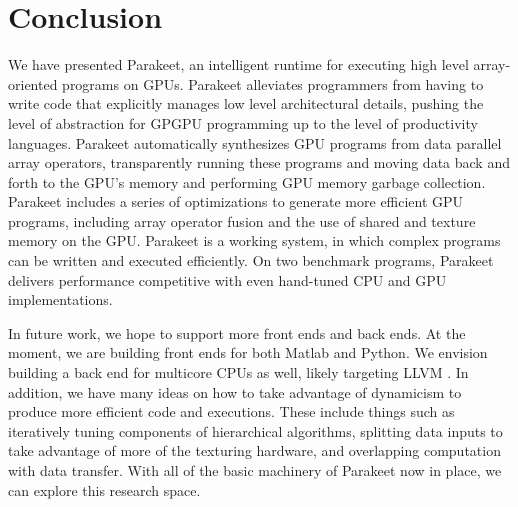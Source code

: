\documentclass[preprint]{sigplanconf}
\begin{document}
\section{Conclusion}
\label{Conclusion}

We have presented Parakeet, an intelligent runtime for executing high level
array-oriented programs on GPUs.  Parakeet alleviates programmers from having
to write code that explicitly manages low level architectural details, pushing
the level of abstraction for GPGPU programming up to the level of productivity
languages.  Parakeet automatically synthesizes GPU programs from data parallel
array operators, transparently running these programs and moving data back and
forth to the GPU's memory and performing GPU memory garbage collection.
Parakeet includes a series of optimizations to generate more efficient GPU
programs, including array operator fusion and the use of shared and texture
memory on the GPU.  Parakeet is a working system, in which complex programs can
be written and executed efficiently.  On two benchmark programs, Parakeet
delivers performance competitive with even hand-tuned CPU and GPU
implementations.

In future work, we hope to support more front ends and back ends.  At the
moment, we are building front ends for both Matlab and Python.  We envision
building a back end for multicore CPUs as well, likely targeting LLVM
\cite{Latt02}.  In addition, we have many ideas on how to take advantage of
dynamicism to produce more efficient code and executions.  These include things
such as iteratively tuning components of hierarchical algorithms, splitting
data inputs to take advantage of more of the texturing hardware, and overlapping
computation with data transfer.  With all of the basic machinery of Parakeet now
in place, we can explore this research space.


{}
\end{document}
